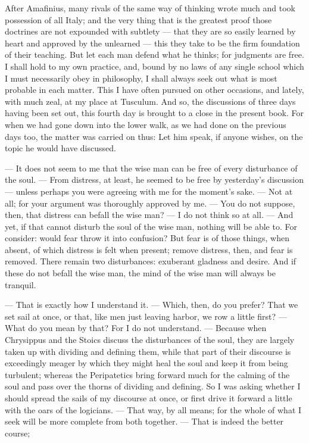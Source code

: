  After Amafinius, many rivals of the same way of thinking wrote much and took possession of all Italy; and the very thing that is the greatest proof those doctrines are not expounded with subtlety — that they are so easily learned by heart and approved by the unlearned — this they take to be the firm foundation of their teaching. But let each man defend what he thinks; for judgments are free. I shall hold to my own practice, and, bound by no laws of any single school which I must necessarily obey in philosophy, I shall always seek out what is most probable in each matter. This I have often pursued on other occasions, and lately, with much zeal, at my place at Tusculum. And so, the discussions of three days having been set out, this fourth day is brought to a close in the present book. For when we had gone down into the lower walk, as we had done on the previous days too, the matter was carried on thus: Let him speak, if anyone wishes, on the topic he would have discussed.

 — It does not seem to me that the wise man can be free of every disturbance of the soul. — From distress, at least, he seemed to be free by yesterday's discussion — unless perhaps you were agreeing with me for the moment's sake. — Not at all; for your argument was thoroughly approved by me. — You do not suppose, then, that distress can befall the wise man? — I do not think so at all. — And yet, if that cannot disturb the soul of the wise man, nothing will be able to. For consider: would fear throw it into confusion? But fear is of those things, when absent, of which distress is felt when present; remove distress, then, and fear is removed. There remain two disturbances: exuberant gladness and desire. And if these do not befall the wise man, the mind of the wise man will always be tranquil.

 — That is exactly how I understand it. — Which, then, do you prefer? That we set sail at once, or that, like men just leaving harbor, we row a little first? — What do you mean by that? For I do not understand. — Because when Chrysippus and the Stoics discuss the disturbances of the soul, they are largely taken up with dividing and defining them, while that part of their discourse is exceedingly meager by which they might heal the soul and keep it from being turbulent; whereas the Peripatetics bring forward much for the calming of the soul and pass over the thorns of dividing and defining. So I was asking whether I should spread the sails of my discourse at once, or first drive it forward a little with the oars of the logicians. — That way, by all means; for the whole of what I seek will be more complete from both together. — That is indeed the better course;

